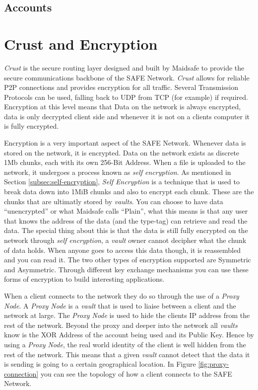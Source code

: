 \subsection{Accounts}

\section{Crust and Encryption}

\textit{Crust} is the secure routing layer designed and built by Maidsafe to provide the secure communications backbone of the SAFE Network. \textit{Crust} allows for reliable P2P connections and provides encryption for all traffic. Several Transmission Protocols can be used, falling back to UDP from TCP (for example) if required. Encryption at this level means that Data on the network is always encrypted, data is only decrypted client side and whenever it is not on a clients computer it is fully encrypted.

Encryption is a very important aspect of the SAFE Network. Whenever data is stored on the network, it is encrypted. Data on the network exists as discrete 1Mb chunks, each with its own 256-Bit Address. When a file is uploaded to the network, it undergoes a process known as \textit{self encryption}. As mentioned in Section \ref{subsec:self-encryption}, \textit{Self Encryption} is a technique that is used to break data down into 1MiB chunks and also to encrypt each chunk. These are the chunks that are ultimatly stored by \textit{vaults}. You can choose to have data ``unencrypted'' or what Maidsafe calls ``Plain'', what this means is that any user that knows the address of the data (and the type-tag) can retrieve and read the data. The special thing about this is that the data is still fully encrypted on the network through \textit{self encryption}, a \textit{vault} owner cannot decipher what the chunk of data holds. When anyone goes to access this data though, it is reassembled and you can read it. The two other types of encryption supported are Symmetric and Asymmetric. Through different key exchange mechanisms you can use these forms of encryption to build interesting applications.

When a client connects to the network they do so through the use of a \textit{Proxy Node}. A \textit{Proxy Node} is a \textit{vault} that is used to liaise between a client and the network at large. The \textit{Proxy Node} is used to hide the clients IP address from the rest of the network. Beyond the proxy and deeper into the network all \textit{vaults} know is the XOR Address of the account being used and its Public Key. Hence by using a \textit{Proxy Node}, the real world identity of the client is well hidden from the rest of the network. This means that a given \textit{vault} cannot detect that the data it is sending is going to a certain geographical location. In Figure \ref{fig:proxy-connection} you can see the topology of how a client connects to the SAFE Network.

